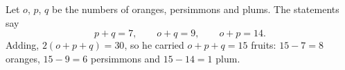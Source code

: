 Let $o$, $p$, $q$ be the numbers of oranges, persimmons and plums. The statements say
\[p+q=7,\qquad o+q=9,\qquad o+p=14.\]
Adding, $2(o+p+q)=30$, so he carried $o+p+q=\boxed{15}$ fruits: $15-7=8$ oranges, $15-9=6$ persimmons and $15-14=1$ plum.

